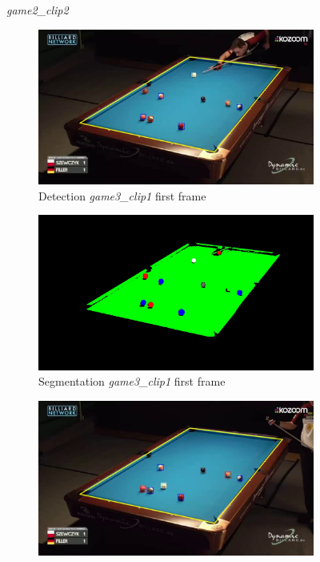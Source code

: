 \begin{figure}[H]
	\caption{\textit{game2\_clip2}}
\end{figure}

\begin{figure}[H]
	\centering
	\begin{subfigure}[b]{0.48\textwidth}
		\centering
		\includegraphics[width=\textwidth]{images/Detection/game3_clip1_detected_balls_first_frame.jpg}
		\caption{Detection \textit{game3\_clip1} first frame}
		\label{fig: game3_clip1_first_frame_detected}
	\end{subfigure}
	\begin{subfigure}[b]{0.48\textwidth}
		\centering
		\includegraphics[width=\textwidth]{images/Segmentation/game3_clip1_segmented_balls_first_frame.jpg}
		\caption{Segmentation \textit{game3\_clip1} first frame}
		\label{fig: game3_clip1_first_frame_segmented}
	\end{subfigure}
	\begin{subfigure}[b]{0.48\textwidth}
		\centering
		\includegraphics[width=\textwidth]{images/Detection/game3_clip1_detected_balls_last_frame.jpg}

\end{subfigure}
\end{figure}
